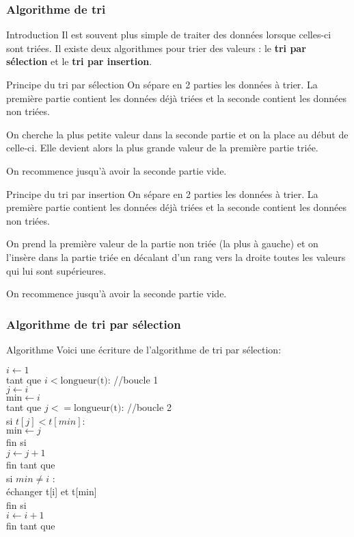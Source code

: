 \documentclass[9pt]{beamer}
\newcommand{\esp}{\hspace{0.5cm}}
\newcommand{\espp}{\hspace{1cm}}
\newcommand{\esppp}{\hspace{1.5cm}}
\begin{document}
\begin{frame}
\frametitle{Algorithme de tri}

\begin{block}{Introduction}
Il est souvent plus simple de traiter des données lorsque celles-ci sont triées. Il existe deux algorithmes pour trier des valeurs : le \textbf{tri par sélection} et le \textbf{tri par insertion}.
\end{block}

\begin{block}{Principe du tri par sélection}
On sépare en 2 parties les données à trier. La première partie contient les données déjà triées et la seconde contient les données non triées.\smallskip

On cherche la plus petite valeur dans la seconde partie et on la place au début de celle-ci. Elle devient alors la plus grande valeur de la première partie triée.\smallskip

On recommence jusqu'à avoir la seconde partie vide.
\end{block}

\begin{block}{Principe du tri par insertion}
On sépare en 2 parties les données à trier. La première partie contient les données déjà triées et la seconde contient les données non triées.\smallskip

On prend la première valeur de la partie non triée (la plus à gauche) et on l'insère dans la partie triée en décalant d'un rang vers la droite toutes les valeurs qui lui sont supérieures.\smallskip

On recommence jusqu'à avoir la seconde partie vide.
\end{block}

\end{frame}

\begin{frame}
\frametitle{Algorithme de tri par sélection}

\begin{block}{Algorithme}
Voici une écriture de l'algorithme de tri par sélection:\medskip

$i \longleftarrow 1$\\
tant que $i < \text{longueur(t)}$:   //boucle 1\\
\esp $j \longleftarrow i$\\
\esp $\text{min} \longleftarrow i$\\
\esp tant que $j <= \text{longueur(t)}$:   //boucle 2\\
\espp si $t[j] < t[min]$:\\
\esppp $\text{min} \longleftarrow j$\\
\espp fin si\\
\esp $j \longleftarrow j+1$\\
\esp fin tant que\\
\esp si $min \neq i$ :\\
\espp échanger t[i] et t[min]\\
\esp fin si\\
\esp $i \longleftarrow i+1$\\
fin tant que
\end{block}

\end{frame}
\end{document}
